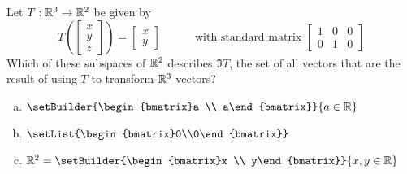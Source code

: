 \begin{activity}{5}
Let $T: \mathbb{R}^3 \rightarrow \mathbb{R}^2$ be given by
\[
  T\left(\begin{bmatrix}x \\ y\\z \end{bmatrix} \right)
    =
  \begin{bmatrix} x \\ y \end{bmatrix}
    \hspace{3em}
    \text{with standard matrix }
  \begin{bmatrix} 1 & 0 & 0 \\ 0 & 1 & 0 \end{bmatrix}
\]
Which of these subspaces of \(\mathbb{R}^2\) describes \(\Im T\),
the set of all vectors that are the result of using \(T\) to transform
\(\mathbb{R}^3\) vectors?
\begin{enumerate}[a)]
\item \(\setBuilder{\begin{bmatrix}a \\ a\end{bmatrix}}{a\in\IR}\)
\item \(\setList{\begin{bmatrix}0\\0\end{bmatrix}}\)
\item \(\IR^2=\setBuilder{\begin{bmatrix}x \\ y\end{bmatrix}}{x,y\in\IR}\)
\end{enumerate}
\end{activity}


